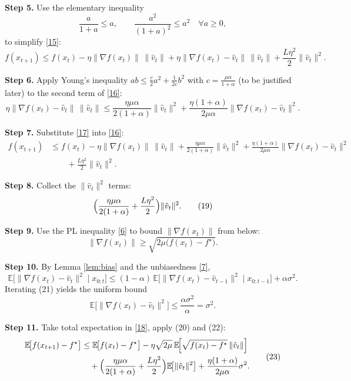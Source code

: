 \documentclass{article}
\newcommand{\EE}{\mathbb{E}}
\begin{document}
\noindent\textbf{Step 5.}  Use the elementary inequality
\[
\frac{a}{1+a}\le a,\qquad
\frac{a^2}{(1+a)^2}\le a^2\quad\forall a\ge0,
\]
to simplify \eqref{15}:
\[
f(x_{t+1})
\le f(x_t)-\eta\|\nabla f(x_t)\|\,\|\hat v_t\|
   +\eta\|\nabla f(x_t)-\hat v_t\|\,\|\hat v_t\|
   +\frac{L\eta^2}{2}\|\hat v_t\|^2 .
\tag{16}
\]

\noindent\textbf{Step 6.}  Apply Young’s inequality $ab\le\frac{c}{2}a^2+\frac{1}{2c}b^2$ with $c=\frac{\mu\alpha}{1+\alpha}$ (to be justified later) to the second term of \eqref{16}:
\[
\eta\|\nabla f(x_t)-\hat v_t\|\,\|\hat v_t\|
\le
\frac{\eta\mu\alpha}{2(1+\alpha)}\|\hat v_t\|^2
+\frac{\eta(1+\alpha)}{2\mu\alpha}\|\nabla f(x_t)-\hat v_t\|^2 .
\tag{17}
\]

\noindent\textbf{Step 7.}  Substitute \eqref{17} into \eqref{16}:
\[
\begin{aligned}
f(x_{t+1})
&\le f(x_t)
-\eta\|\nabla f(x_t)\|\,\|\hat v_t\|
+\frac{\eta\mu\alpha}{2(1+\alpha)}\|\hat v_t\|^2
+\frac{\eta(1+\alpha)}{2\mu\alpha}\|\nabla f(x_t)-\hat v_t\|^2  \\
&\qquad
+\frac{L\eta^2}{2}\|\hat v_t\|^2 .
\end{aligned}
\tag{18}
\]

\noindent\textbf{Step 8.}  Collect the $\|\hat v_t\|^2$ terms:
\[
\Bigl(\frac{\eta\mu\alpha}{2(1+\alpha)}+\frac{L\eta^2}{2}\Bigr)\|\hat v_t\|^2 .
\tag{19}
\]

\noindent\textbf{Step 9.}  Use the PL inequality \eqref{6} to bound $\|\nabla f(x_t)\|$ from below:
\[
\|\nabla f(x_t)\|\ge\sqrt{2\mu\bigl(f(x_t)-f^\star\bigr)} .
\tag{20}
\]

\noindent\textbf{Step 10.}  By Lemma \ref{lem:bias} and the unbiasedness \eqref{7},
\[
\EE\!\bigl[\|\nabla f(x_t)-\hat v_t\|^2\mid x_{0:t}\bigr]
\le (1-\alpha)\,\EE\!\bigl[\|\nabla f(x_t)-\hat v_{t-1}\|^2\mid x_{0:t-1}\bigr]
+\alpha\sigma^2 .
\tag{21}
\]
Iterating (21) yields the uniform bound
\[
\EE\!\bigl[\|\nabla f(x_t)-\hat v_t\|^2\bigr]\le\frac{\alpha\sigma^2}{\alpha}= \sigma^2 .
\tag{22}
\]

\noindent\textbf{Step 11.}  Take total expectation in \eqref{18}, apply (20) and (22):
\[
\begin{aligned}
\EE\!\bigl[f(x_{t+1})-f^\star\bigr]
&\le \EE\!\bigl[f(x_t)-f^\star\bigr]
-\eta\sqrt{2\mu}\,\EE\!\Bigl[\sqrt{f(x_t)-f^\star}\,\|\hat v_t\|\Bigr]  \\
&\quad
+\Bigl(\frac{\eta\mu\alpha}{2(1+\alpha)}+\frac{L\eta^2}{2}\Bigr)
\EE\!\bigl[\|\hat v_t\|^2\bigr]
+\frac{\eta(1+\alpha)}{2\mu\alpha}\sigma^2 .
\end{aligned}
\tag{23}
\]
\end{document}

